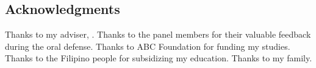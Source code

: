 \begin{singlespace}
    \chapter{Acknowledgments}
\end{singlespace}

Thanks to my adviser, \Adviser. Thanks to the panel members for their valuable feedback during the oral defense. Thanks to ABC Foundation for funding my studies. Thanks to the Filipino people for subsidizing my education. Thanks to my family.
